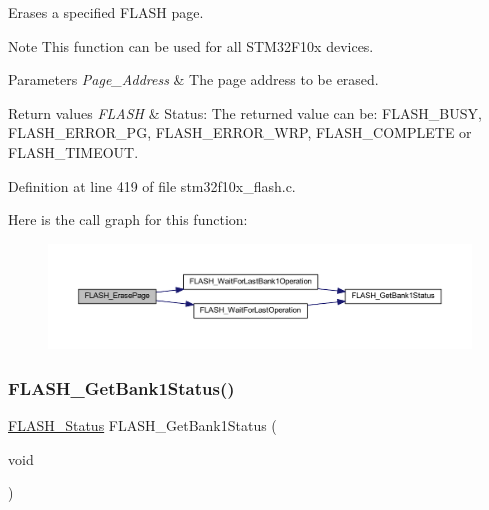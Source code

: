 Erases a specified F\+L\+A\+SH page. 

\begin{DoxyNote}{Note}
This function can be used for all S\+T\+M32\+F10x devices. 
\end{DoxyNote}

\begin{DoxyParams}{Parameters}
{\em Page\+\_\+\+Address} & The page address to be erased. \\
\hline
\end{DoxyParams}

\begin{DoxyRetVals}{Return values}
{\em F\+L\+A\+SH} & Status\+: The returned value can be\+: F\+L\+A\+S\+H\+\_\+\+B\+U\+SY, F\+L\+A\+S\+H\+\_\+\+E\+R\+R\+O\+R\+\_\+\+PG, F\+L\+A\+S\+H\+\_\+\+E\+R\+R\+O\+R\+\_\+\+W\+RP, F\+L\+A\+S\+H\+\_\+\+C\+O\+M\+P\+L\+E\+TE or F\+L\+A\+S\+H\+\_\+\+T\+I\+M\+E\+O\+UT. \\
\hline
\end{DoxyRetVals}


Definition at line 419 of file stm32f10x\+\_\+flash.\+c.

Here is the call graph for this function\+:
\nopagebreak
\begin{figure}[H]
\begin{center}
\leavevmode
\includegraphics[width=350pt]{group___f_l_a_s_h___exported___functions_ga13a2ca18bfb3d5fb827a2751799f8451_cgraph}
\end{center}
\end{figure}
\mbox{\label{group___f_l_a_s_h___exported___functions_ga9d5b76b75ef4c578cc45dc836a1929b6}} 
\subsubsection{\texorpdfstring{F\+L\+A\+S\+H\+\_\+\+Get\+Bank1\+Status()}{FLASH\_GetBank1Status()}}
{\footnotesize\ttfamily \hyperlink{group___f_l_a_s_h___exported___types_gadc63a6f3404ff1f71229a66915e9cdc0}{F\+L\+A\+S\+H\+\_\+\+Status} F\+L\+A\+S\+H\+\_\+\+Get\+Bank1\+Status (\begin{DoxyParamCaption}\item[{void}]{ }\end{DoxyParamCaption})}



